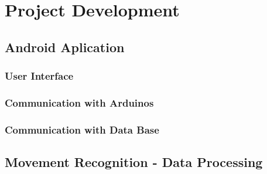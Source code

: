 

%

\chapter{Project Development}
\label{cha:proj_development}

\section{Android Aplication}
\label{sec:android_app}

\subsection{User Interface}
\label{ssec:android_interface}

\subsection{Communication with Arduinos}
\label{ssec:android_com_arduino}

\subsection{Communication with Data Base}
\label{ssec:android_com_data_base}

\section{Movement Recognition - Data Processing}
\label{sec:data_processing}


